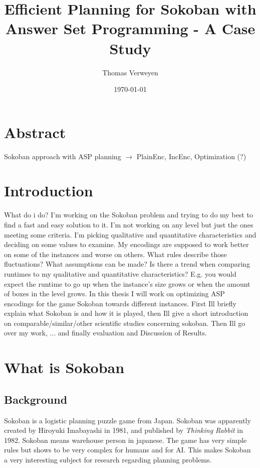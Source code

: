 \documentclass{article}
\title{Efficient Planning for Sokoban with Answer Set Programming - A Case Study}
\author{Thomas Verweyen}
\date{\today}
\begin{document}
\maketitle
\renewcommand*\contentsname{Summary}
\tableofcontents
\newpage
\section*{Abstract}
Sokoban approach with ASP planning $\rightarrow$ PlainEnc, IncEnc, Optimization (?)
\section{Introduction}
What do i do? I'm working on the Sokoban problem and trying to do my best to find a fast and easy solution to it. I'm not working on any level but just the ones meeting some criteria. I'm picking qualitative and quantitative characteristics and deciding on some values to examine. My encodings are supposed to work better on some of the instances and worse on others. What rules describe those fluctuations? What assumptions can be made? Is there a trend when comparing runtimes to my qualitative and quantitative characteristics? E.g. you would expect the runtime to go up when the instance's size grows or when the amount of boxes in the level grows.
In this thesis I will work on optimizing ASP encodings for the game Sokoban towards different instances. First Ill briefly explain what Sokoban is and how it is played, then Ill give a short introduction on comparable/similar/other scientific studies concerning sokoban. Then Ill go over my work, ... and finally evaluation and Discussion of Results.
\newpage
\section{What is Sokoban}
\subsection{Background}
Sokoban is a logistic planning puzzle game from Japan. Sokoban was apparently created by Hiroyuki Imabayashi in 1981, and published by \textit{Thinking Rabbit} in 1982. Sokoban means warehouse person in japanese. The game has very simple rules but shows to be very complex for humans and for AI. This makes Sokoban a very interesting subject for research regarding planning problems.
\end{document}

